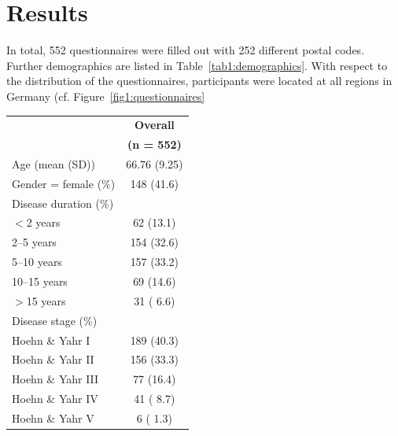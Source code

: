 \documentclass{bmcart}
\begin{document}
\section*{Results}
In total, 552 questionnaires were filled out with 252 different postal codes. Further demographics are listed in Table~\ref{tab1:demographics}. With respect to the distribution of the questionnaires, participants were located at all regions in Germany (cf. Figure~\ref{fig1:questionnaires}

\begin{table}[!ht]
\begin{tabular}{p{5cm} c}
\toprule
																	&	\textbf{Overall}	\\ %
																	& 	\textbf{(n = 552)}\\ 
\midrule
Age (mean (SD)) 															& 	66.76 (9.25) 	\\ \hline
Gender = female (\%) 														&  	148 (41.6)  		\\ \hline
Disease duration (\%) 														& 				\\ \hline
\hspace{3mm} $<$2 years 													& 	62 (13.1) 		\\ \hline
\hspace{3mm} 2--5 years 													& 	154 (32.6) 		\\ \hline
\hspace{3mm} 5--10 years 													& 	157 (33.2) 		\\ \hline
\hspace{3mm} 10--15 years 													& 	69 (14.6) 		\\ \hline
\hspace{3mm} $>$15 years													& 	31 ( 6.6) 		\\ \hline
Disease stage (\%)														& 				\\ \hline
\hspace{3mm} Hoehn \& Yahr I 												&  	189 (40.3) 		\\ \hline
\hspace{3mm} Hoehn \& Yahr II 												& 	156 (33.3)  		\\ \hline
\hspace{3mm} Hoehn \& Yahr III  												&   	77 (16.4) 		\\ \hline
\hspace{3mm} Hoehn \& Yahr IV  												& 	41 ( 8.7) 		\\ \hline
\hspace{3mm} Hoehn \& Yahr V  												&     	6 ( 1.3) 		\\ \hline

\end{tabular}
\end{table}
\end{document}
